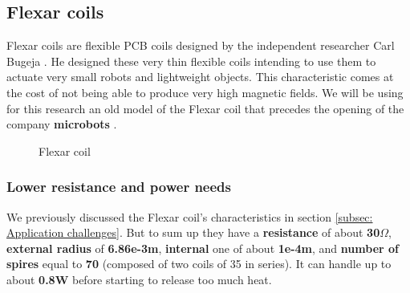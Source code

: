 \subsection{Flexar coils}
Flexar coils are flexible PCB coils designed by the independent researcher Carl Bugeja \cite{Carl_Bugeja}.
He designed these very thin flexible coils intending to use them to actuate very small robots and lightweight objects.
This characteristic comes at the cost of not being able to produce very high magnetic fields.
We will be using for this research an old model of the Flexar coil that precedes the opening of the company \textbf{microbots} \cite{microbots}.
\begin{figure}
    \centering
    \caption{Flexar coil }
    \label{fig:Flexar_coil}
\end{figure}


\subsubsection{Lower resistance and power needs}
We previously discussed the Flexar coil's characteristics in section \ref{subsec: Application challenges}.
But to sum up they have a \textbf{resistance} of about \textbf{30$\Omega$}, \textbf{external radius} of \textbf{6.86e-3m}, \textbf{internal} one of about \textbf{1e-4m}, and \textbf{number of spires} equal to \textbf{70} (composed of two coils of 35 in series).
It can handle up to about \textbf{0.8W} before starting to release too much heat.

